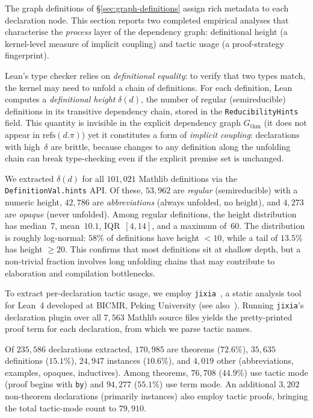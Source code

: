 The graph definitions of \S\ref{sec:graph-definitions} assign rich metadata to each declaration node. This section reports two completed empirical analyses that characterise the \emph{process} layer of the dependency graph: definitional height (a kernel-level measure of implicit coupling) and tactic usage (a proof-strategy fingerprint).

\label{sec:definitional-height}
Lean's type checker relies on \emph{definitional equality}: to verify that two types match, the kernel may need to unfold a chain of definitions. For each definition, Lean computes a \emph{definitional height} $\delta(d)$, the number of regular (semireducible) definitions in its transitive dependency chain, stored in the \texttt{ReducibilityHints} field. This quantity is invisible in the explicit dependency graph $G_{\mathrm{thm}}$ (it does not appear in $\mathrm{refs}(d.\pi)$) yet it constitutes a form of \emph{implicit coupling}: declarations with high~$\delta$ are brittle, because changes to any definition along the unfolding chain can break type-checking even if the explicit premise set is unchanged.

We extracted $\delta(d)$ for all $101{,}021$ Mathlib definitions via the \texttt{DefinitionVal.hints} API. Of these, $53{,}962$ are \emph{regular} (semireducible) with a numeric height, $42{,}786$ are \emph{abbreviations} (always unfolded, no height), and $4{,}273$ are \emph{opaque} (never unfolded). Among regular definitions, the height distribution has median~$7$, mean~$10.1$, IQR~$[4, 14]$, and a maximum of~$60$. The distribution is roughly log-normal: $58\%$ of definitions have height $< 10$, while a tail of $13.5\%$ has height $\ge 20$. This confirms that most definitions sit at shallow depth, but a non-trivial fraction involves long unfolding chains that may contribute to elaboration and compilation bottlenecks.

\label{sec:tactic-usage}
To extract per-declaration tactic usage, we employ \texttt{jixia}~\cite{jixia2024}, a static analysis tool for Lean~4 developed at BICMR, Peking University (see also~\cite{gao2025herald}). Running \texttt{jixia}'s declaration plugin over all $7{,}563$ Mathlib source files yields the pretty-printed proof term for each declaration, from which we parse tactic names.

Of $235{,}586$ declarations extracted, $170{,}985$ are theorems ($72.6\%$), $35{,}635$ definitions ($15.1\%$), $24{,}947$ instances ($10.6\%$), and $4{,}019$ other (abbreviations, examples, opaques, inductives).
Among theorems, $76{,}708$ ($44.9\%$) use tactic mode (proof begins with \texttt{by}) and $94{,}277$ ($55.1\%$) use term mode. An additional $3{,}202$ non-theorem declarations (primarily instances) also employ tactic proofs, bringing the total tactic-mode count to $79{,}910$.

